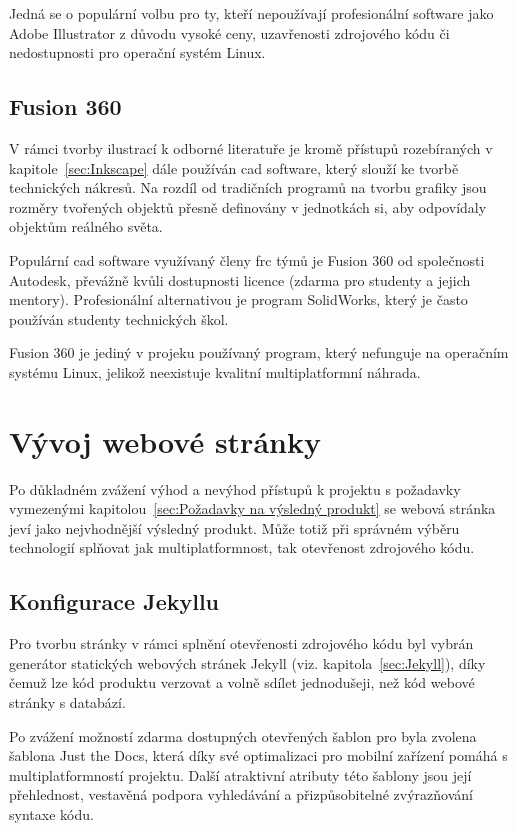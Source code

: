 \documentclass[a4paper, 12pt]{article}
\newcommand*{\fullref}[1]{\hyperref[{#1}]{\ref*{#1}}}
\begin{document}
  Jedná se o populární volbu pro ty, kteří nepoužívají profesionální software jako Adobe Illustrator z důvodu vysoké ceny, uzavřenosti zdrojového kódu či nedostupnosti pro operační systém Linux.


  \subsection{Fusion 360} \label{sec:Fusion 360}
  V rámci tvorby ilustrací k odborné literatuře je kromě přístupů rozebíraných v kapitole~\fullref{sec:Inkscape} dále používán \gls{cad} software, který slouží ke tvorbě technických nákresů. Na rozdíl od tradičních programů na tvorbu grafiky jsou rozměry tvořených objektů přesně definovány v jednotkách \gls{si}, aby odpovídaly objektům reálného světa.

  Populární \gls{cad} software využívaný členy \gls{frc} týmů je Fusion 360 od společnosti Autodesk, převážně kvůli dostupnosti licence (zdarma pro studenty a jejich mentory). Profesionální alternativou je program SolidWorks, který je často používán studenty technických škol.

  Fusion 360 je jediný v projeku používaný program, který nefunguje na operačním systému Linux, jelikož neexistuje kvalitní multiplatformní náhrada.


  \section{Vývoj webové stránky}
  Po důkladném zvážení výhod a nevýhod přístupů k projektu s požadavky vymezenými kapitolou~\fullref{sec:Požadavky na výsledný produkt} se webová stránka jeví jako nejvhodnější výsledný produkt. Může totiž při správném výběru technologií splňovat jak multiplatformnost, tak otevřenost zdrojového kódu.


  \subsection{Konfigurace Jekyllu}
  Pro tvorbu stránky v rámci splnění otevřenosti zdrojového kódu byl vybrán generátor statických webových stránek Jekyll (viz. kapitola~\fullref{sec:Jekyll}), díky čemuž lze kód produktu verzovat a volně sdílet jednodušeji, než kód webové stránky s databází.

  Po zvážení možností zdarma dostupných otevřených šablon pro byla zvolena šablona Just the Docs, která díky své optimalizaci pro mobilní zařízení pomáhá s multiplatformností projektu. Další atraktivní atributy této šablony jsou její přehlednost, vestavěná podpora vyhledávání a přizpůsobitelné zvýrazňování syntaxe kódu.
\end{document}
